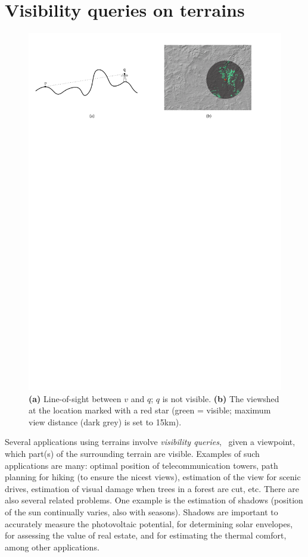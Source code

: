 
\graphicspath{{visibility/}}

\chapter{Visibility queries on terrains}
\label{chap:visibility}

\begin{figure}[ht]
  \centering
  \includegraphics[width=\linewidth]{figs/overview_los_viewshed.pdf}
  \caption{\textbf{(a)} Line-of-sight between $v$ and $q$; $q$ is not visible. \textbf{(b)} The viewshed at the location marked with a red star (green = visible; maximum view distance (dark grey) is set to 15km).}
\label{fig:overview_los_viewshed}
\end{figure}

Several applications using terrains involve \emph{visibility queries}, \ie\ given a viewpoint, which part(s) of the surrounding terrain are visible.
Examples of such applications are many: optimal position of telecommunication towers, path planning for hiking (to ensure the nicest views), estimation of the view for scenic drives, estimation of visual damage when trees in a forest are cut, etc.
There are also several related problems.
One example is the estimation of shadows (position of the sun continually varies, also with seasons).
Shadows are important to accurately measure the photovoltaic potential, for determining solar envelopes, for assessing the value of real estate, and for estimating the thermal comfort, among other applications.


